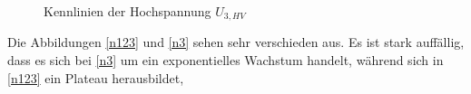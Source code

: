         \begin{figure}[htbp]
            \caption{Kennlinien der Hochspannung $U_{3,HV}$}
        \end{figure}
        Die Abbildungen \ref{n123} und \ref{n3} sehen sehr verschieden aus. Es ist stark auffällig, dass es sich bei \ref{n3} um ein exponentielles Wachstum handelt, während sich in \ref{n123} ein Plateau herausbildet, 